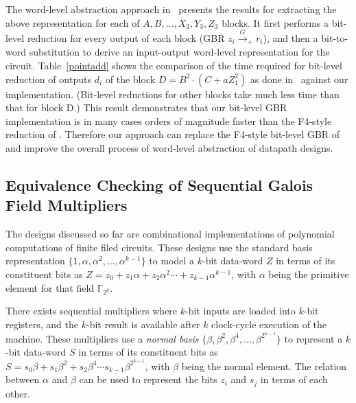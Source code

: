 The word-level abstraction approach in~\cite{pruss:tcad} presents the
results for extracting  the above representation for each of
$A,B,\dots, X_3,Y_3,Z_3$ blocks. It first performs a bit-level
reduction for every output of each block (GBR $z_i\xrightarrow{G}_+
r_i$), and then a  bit-to-word substitution to derive an input-output
word-level representation for the circuit. Table~\ref{pointadd} shows
the comparison of the time required for bit-level reduction of outputs
$d_i$ of the block $D= B^2\cdot(C + aZ_1^2)$ as done
in~\cite{pruss:tcad} against our implementation. (Bit-level
reductions for other blocks take much less time than that for block
D.) This result demonstrates that our bit-level GBR implementation
is in many cases orders of magnitude faster than the F4-style
reduction of \cite{pruss:tcad}. Therefore our approach can replace the
F4-style bit-level GBR of \cite{pruss:tcad} and improve the overall
process of word-level abstraction of datapath designs.   

\subsection{Equivalence Checking of Sequential Galois Field Multipliers}
The designs discussed so far are combinational implementations of
polynomial computations of finite filed circuits. These designs use
the standard basis representation $\{1,\alpha,\alpha^2, \dots,
\alpha^{k-1}\}$ to model a $k$-bit data-word $Z$ in terms of its
constituent bits as $Z = z_0 + z_1 \alpha + z_2 \alpha^2 \cdots +
z_{k-1} \alpha^{k-1}$, with $\alpha$ being the primitive element for
that field $\mathbb{F}_{2^k}$. 

\par 
There exists sequential
multipliers where $k$-bit inputs are loaded into $k$-bit registers,
and the $k$-bit result is available  after $k$ clock-cycle execution
of the machine. These multipliers use a {\it normal basis}
$\{\beta,\beta^{2},\beta^{4},\dots,\beta^{2^{k-1}}\}$ to  represent a
$k$-bit data-word $S$ in terms of its constituent bits as $S =
s_0\beta + s_1\beta^{2} + s_2\beta^{4} \cdots s_{k-1}\beta^{2^{k-1}}$,
with $\beta$ being the normal element. The relation between $\alpha$
and $\beta$ can be used to represent  the bits $z_i$ and $s_j$ in
terms of each other.  


